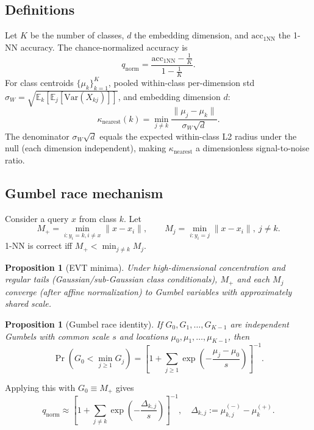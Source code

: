 \documentclass{article}
\newtheorem{proposition}[theorem]{Proposition}
\begin{document}
\subsection{Definitions}
Let $K$ be the number of classes, $d$ the embedding dimension, and $\mathrm{acc}_{1\mathrm{NN}}$ the 1-NN accuracy.
The chance-normalized accuracy is
\begin{equation}
q_{\mathrm{norm}}=\frac{\mathrm{acc}_{1\mathrm{NN}}-\tfrac{1}{K}}{1-\tfrac{1}{K}}.
\end{equation}
For class centroids $\{\mu_k\}_{k=1}^K$, pooled within-class per-dimension std $\sigma_W=\sqrt{\mathbb{E}_k[\mathbb{E}_j[\mathrm{Var}(X_{kj})]]}$, and embedding dimension $d$:
\begin{equation}
\kappa_{\mathrm{nearest}}(k)=\min_{j\neq k}\frac{\|\mu_j-\mu_k\|}{\sigma_W\sqrt{d}}.
\end{equation}
The denominator $\sigma_W\sqrt{d}$ equals the expected within-class L2 radius under the null (each dimension independent), making $\kappa_{\mathrm{nearest}}$ a dimensionless signal-to-noise ratio.

\subsection{Gumbel race mechanism}
Consider a query $x$ from class $k$. Let
\[
M_+=\min_{i:y_i=k,i\neq x}\|x-x_i\|,\qquad
M_j=\min_{i:y_i=j}\|x-x_i\|,\ j\neq k.
\]
1-NN is correct iff $M_+<\min_{j\neq k}M_j$.

\begin{proposition}[EVT minima]
Under high-dimensional concentration and regular tails (Gaussian/sub-Gaussian class conditionals), $M_+$ and each $M_j$ converge (after affine normalization) to Gumbel variables with approximately shared scale.
\end{proposition}

\begin{proposition}[Gumbel race identity]
If $G_0,G_1,\dots,G_{K-1}$ are independent Gumbels with common scale $s$ and locations $\mu_0,\mu_1,\dots,\mu_{K-1}$, then
\[
\Pr\!\left(G_0<\min_{j\ge1}G_j\right)=
\left[1+\sum_{j\ge1}\exp\!\left(-\frac{\mu_j-\mu_0}{s}\right)\right]^{-1}.
\]
\end{proposition}

Applying this with $G_0\equiv M_+$ gives
\begin{equation}
\label{eq:gumbel-sum}
q_{\mathrm{norm}}
\approx
\left[
1+\sum_{j\neq k}\exp\!\left(-\frac{\Delta_{k,j}}{s}\right)
\right]^{-1},
\quad
\Delta_{k,j}:=\mu_{k,j}^{(-)}-\mu_k^{(+)}.
\end{equation}
\end{document}
